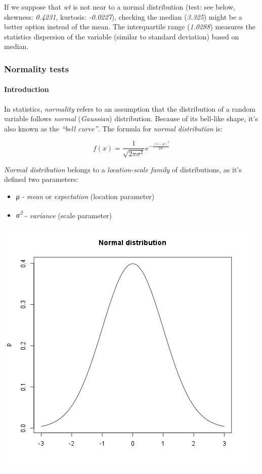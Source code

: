 \documentclass[]{article}
\makeatletter
\def\maxwidth{\ifdim\Gin@nat@width>\linewidth\linewidth
\else\Gin@nat@width\fi}
\let\Oldincludegraphics\includegraphics
\renewcommand{\includegraphics}[1]{\Oldincludegraphics[width=\maxwidth]{#1}}
\makeatother
\begin{document}
If we suppose that \emph{wt} is not near to a normal distribution (test:
see below, skewness: \emph{0.4231}, kurtosis: \emph{-0.0227}), checking
the median (\emph{3.325}) might be a better option instead of the mean.
The interquartile range (\emph{1.0288}) measures the statistics
dispersion of the variable (similar to standard deviation) based on
median.

\subsubsection{Normality tests}

\paragraph{Introduction}

In statistics, \emph{normality} refers to an assumption that the
distribution of a random variable follows \emph{normal}
(\emph{Gaussian}) distribution. Because of its bell-like shape, it's
also known as the \emph{``bell curve''}. The formula for \emph{normal
distribution} is:

\[f(x) = \frac{1}{\sqrt{2\pi{}\sigma{}^2}} e^{-\frac{(x-\mu{})^2}{2\sigma{}^2}}\]

\emph{Normal distribution} belongs to a \emph{location-scale family} of
distributions, as it's defined two parameters:

\begin{itemize}
\item
  \emph{μ} - \emph{mean} or \emph{expectation} (location parameter)
\item
  \emph{σ\textsuperscript{2}} - \emph{variance} (scale parameter)
\end{itemize}
\href{806ea97c59e1a12d4acae4968957aaa9-hires.png}{\includegraphics{806ea97c59e1a12d4acae4968957aaa9.png}}
\end{document}

